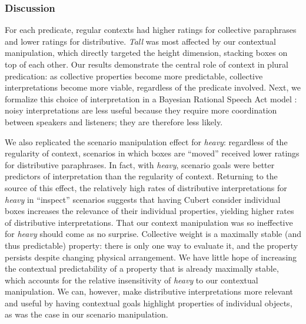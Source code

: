 \documentclass[linguex]{sp}
\begin{document}

\subsubsection{Discussion}

For each predicate, regular contexts had higher ratings for collective paraphrases and lower ratings for distributive. \textit{Tall} was most affected by our contextual manipulation, which directly targeted the height dimension, stacking boxes on top of each other. Our results demonstrate the central role of context in plural predication: as collective properties become more predictable, collective interpretations become more viable, regardless of the predicate involved. Next, we formalize this choice of interpretation in a Bayesian Rational Speech Act model \citep{frankgoodman2012,lassitergoodman2013}: noisy interpretations are less useful because they require more coordination between speakers and listeners; they are therefore less likely.

We also replicated the scenario manipulation effect for \emph{heavy}: regardless of the regularity of context, scenarios in which boxes are ``moved'' received lower ratings for distributive paraphrases. In fact, with \emph{heavy}, scenario goals were better predictors of interpretation than the regularity of context. Returning to the source of this effect, the relatively high rates of distributive interpretations for \emph{heavy} in ``inspect'' scenarios suggests that having Cubert consider individual boxes increases the relevance of their individual properties, yielding higher rates of distributive interpretations. That our context manipulation was so ineffective for \textit{heavy} should come as no surprise. Collective weight is a maximally stable (and thus predictable) property: there is only one way to evaluate it, and the property persists despite changing physical arrangement. We have little hope of increasing the contextual predictability of a property that is already maximally stable, which accounts for the relative insensitivity of \emph{heavy} to our contextual manipulation. We can, however, make distributive interpretations more relevant and useful by having contextual goals highlight properties of individual objects, as was the case in our scenario manipulation.
\end{document}
